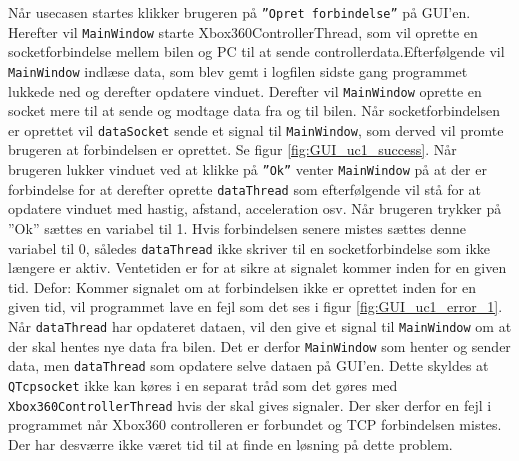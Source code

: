 Når usecasen startes klikker brugeren på \texttt{''Opret forbindelse''} på GUI'en.
Herefter vil \texttt{MainWindow} starte Xbox360ControllerThread, som vil oprette en socketforbindelse mellem bilen og PC til at sende controllerdata.\linebreak[2]
Efterfølgende vil \texttt{MainWindow} indlæse data, som blev gemt i logfilen sidste gang programmet lukkede ned og derefter opdatere vinduet. \linebreak[2]
Derefter vil \texttt{MainWindow} oprette en socket mere til at sende og modtage data fra og til bilen. \linebreak[2]
Når socketforbindelsen er oprettet vil \texttt{dataSocket} sende et signal til \texttt{MainWindow}, som derved vil promte brugeren at forbindelsen er oprettet. 
Se figur \ref{fig:GUI_uc1_success}. \linebreak[2]
Når brugeren lukker vinduet ved at klikke på \texttt{''Ok''} venter \texttt{MainWindow} på at der er forbindelse for at derefter oprette \texttt{dataThread} som efterfølgende vil stå for at opdatere vinduet med hastig, afstand, acceleration osv.  \linebreak[2]
Når brugeren trykker på ''Ok'' sættes en variabel til 1. \linebreak[2]
Hvis forbindelsen senere mistes sættes denne variabel til 0, således \texttt{dataThread} ikke skriver til en socketforbindelse som ikke længere er aktiv. 
Ventetiden er for at sikre at signalet kommer inden for en given tid.  \linebreak[2]
Defor: Kommer signalet om at forbindelsen ikke er oprettet inden for en given tid, vil programmet lave en fejl som det ses i figur \ref{fig:GUI_uc1_error_1}. \linebreak[2]
Når \texttt{dataThread} har opdateret dataen, vil den give et signal til \texttt{MainWindow} om at der skal hentes nye data fra bilen. \linebreak[2]
Det er derfor \texttt{MainWindow} som henter og sender data, men \texttt{dataThread} som opdatere selve dataen på GUI'en. \linebreak[2]
Dette skyldes at \texttt{QTcpsocket} ikke kan køres i en separat tråd som det gøres med \texttt{Xbox360ControllerThread} hvis der skal gives signaler. \linebreak[2]
Der sker derfor en fejl i programmet når Xbox360 controlleren er forbundet og TCP forbindelsen mistes. \linebreak[2]
Der har desværre ikke været tid til at finde en løsning på dette problem.  



